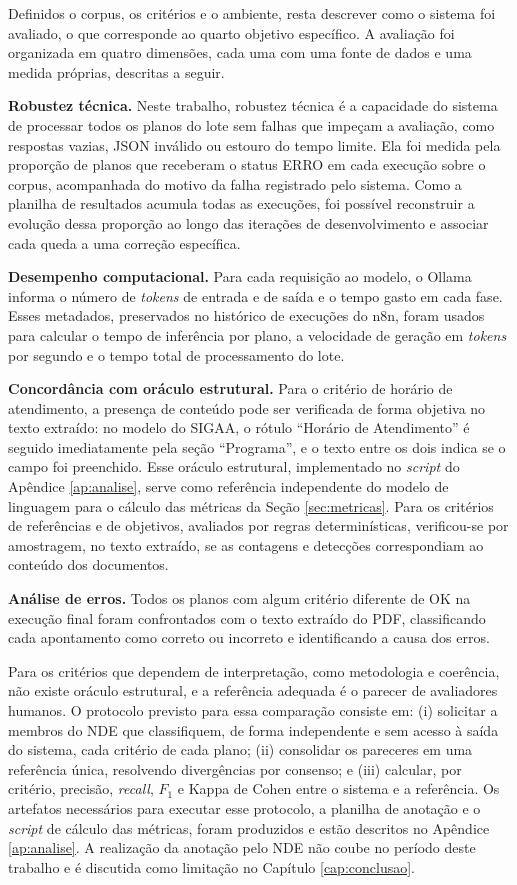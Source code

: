 Definidos o corpus, os critérios e o ambiente, resta descrever como o sistema foi avaliado, o que corresponde ao quarto objetivo específico. A avaliação foi organizada em quatro dimensões, cada uma com uma fonte de dados e uma medida próprias, descritas a seguir.

\textbf{Robustez técnica.} Neste trabalho, robustez técnica é a capacidade do sistema de processar todos os planos do lote sem falhas que impeçam a avaliação, como respostas vazias, JSON inválido ou estouro do tempo limite. Ela foi medida pela proporção de planos que receberam o status ERRO em cada execução sobre o corpus, acompanhada do motivo da falha registrado pelo sistema. Como a planilha de resultados acumula todas as execuções, foi possível reconstruir a evolução dessa proporção ao longo das iterações de desenvolvimento e associar cada queda a uma correção específica.

\textbf{Desempenho computacional.} Para cada requisição ao modelo, o Ollama informa o número de \textit{tokens} de entrada e de saída e o tempo gasto em cada fase. Esses metadados, preservados no histórico de execuções do n8n, foram usados para calcular o tempo de inferência por plano, a velocidade de geração em \textit{tokens} por segundo e o tempo total de processamento do lote.

\textbf{Concordância com oráculo estrutural.} Para o critério de horário de atendimento, a presença de conteúdo pode ser verificada de forma objetiva no texto extraído: no modelo do SIGAA, o rótulo ``Horário de Atendimento'' é seguido imediatamente pela seção ``Programa'', e o texto entre os dois indica se o campo foi preenchido. Esse oráculo estrutural, implementado no \textit{script} do Apêndice \ref{ap:analise}, serve como referência independente do modelo de linguagem para o cálculo das métricas da Seção \ref{sec:metricas}. Para os critérios de referências e de objetivos, avaliados por regras determinísticas, verificou-se por amostragem, no texto extraído, se as contagens e detecções correspondiam ao conteúdo dos documentos.

\textbf{Análise de erros.} Todos os planos com algum critério diferente de OK na execução final foram confrontados com o texto extraído do PDF, classificando cada apontamento como correto ou incorreto e identificando a causa dos erros.

Para os critérios que dependem de interpretação, como metodologia e coerência, não existe oráculo estrutural, e a referência adequada é o parecer de avaliadores humanos. O protocolo previsto para essa comparação consiste em: (i) solicitar a membros do NDE que classifiquem, de forma independente e sem acesso à saída do sistema, cada critério de cada plano; (ii) consolidar os pareceres em uma referência única, resolvendo divergências por consenso; e (iii) calcular, por critério, precisão, \textit{recall}, $F_1$ e Kappa de Cohen entre o sistema e a referência. Os artefatos necessários para executar esse protocolo, a planilha de anotação e o \textit{script} de cálculo das métricas, foram produzidos e estão descritos no Apêndice \ref{ap:analise}. A realização da anotação pelo NDE não coube no período deste trabalho e é discutida como limitação no Capítulo \ref{cap:conclusao}.

